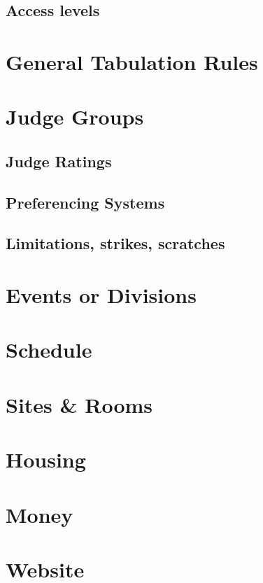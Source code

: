 \documentclass[12pt]{report}
\begin{document}
		\subsection{Access levels}

	\section{General Tabulation Rules}

	\section{Judge Groups}
		\subsection{Judge Ratings}
		\subsection{Preferencing Systems}
		\subsection{Limitations, strikes, scratches}

	\section{Events or Divisions}

	\section{Schedule}

	\section{Sites \& Rooms} 

	\section{Housing}

	\section{Money}

	\section{Website}
\end{document}
